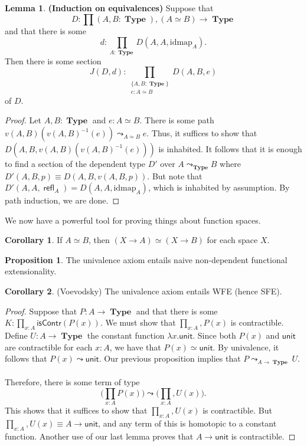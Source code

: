 \documentclass[10pt,letterpaper,cm]{nupset}
\theoremstyle{definition}
\newtheorem{corollary}{Corollary}
\newtheorem{lemma}{Lemma}
\newtheorem{prop}{Proposition}
\newcommand{\1}{\mathbf{1}}
\newcommand{\0}{\vec 0}
\DeclareMathOperator{\refl}{\mathsf{refl}}
\DeclareMathOperator{\type}{\mathbf{Type}}
\begin{document}
\begin{lemma}{\textbf{(Induction on equivalences)}} 
Suppose that $$D: \prod(A, B : \type), (A \simeq B) \to \type$$ and that there is some $$d: \prod_{A: \type}D(A, A, \text{idmap}_A).$$ Then there is some section  $$J(D, d)  :  \prod_{\substack{\{A,B:\type\} \\ e:A\simeq B}} D(A,B,e) $$ of $D$. 
\end{lemma}
\begin{proof}
Let $A,B: \type$ and $e: A \simeq B$. There is some path $v(A,B)(v(A,B)^{-1}(e))\leadsto_{A\simeq B} e$. Thus, it suffices to show that $D(A, B, v(A,B)(v(A,B)^{-1}(e)))$ is inhabited. It follows that it is enough to find a section of the dependent type $D'$ over $A\leadsto_{\type} B$ where $D'(A, B, p) \equiv D(A, B, v(A, B, p))$. But note that $D'(A, A, \refl_A) = D(A, A, \text{idmap}_A)$, which is inhabited by assumption. By path induction, we are done.
\end{proof}

We now have a powerful tool for proving things about function spaces.

\begin{corollary}
If $A \simeq B$, then $(X \to A) \simeq (X \to B)$ for each space $X$.
\end{corollary}

\begin{prop}
The univalence axiom entails naive non-dependent functional extensionality. 
\end{prop}

\begin{corollary}{(Voevodsky)}
The univalence axiom entails WFE (hence SFE).
\end{corollary}
\begin{proof}
Suppose that $P: A \to \type$ and that there is some $K: \prod_{x:A}\mathsf{isContr}(P(x))$. We must show that $\prod_{x:A}, P(x)$ is contractible.  Define $U: A \to \type$ the constant function $\lambda x. \mathsf{unit}$. Since both $P(x)$ and $ \mathsf{unit}$ are contractible for each $x:A$, we have that $P(x) \simeq  \mathsf{unit}$. By univalence, it follows that $P(x) \leadsto  \mathsf{unit}$.  Our previous proposition implies that $P\leadsto_{A \to \type} U$.
\\ \\ Therefore, there is some term of type $$  \big (\prod_{x:A} P(x) \big ) \leadsto \big (\prod_{x:A}, U(x) \big )  .$$ This shows that it suffices to show that $\prod_{x:A}, U(x)$ is contractible.  But $\prod_{x:A}, U(x) \equiv A \to \mathsf{unit}$, and any term of this is homotopic to a constant function. Another use of our last lemma proves that $A \to \mathsf{unit}$ is contractible. 
\end{proof}
\end{document}
